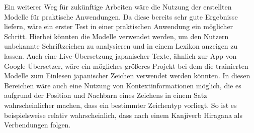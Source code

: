 \documentclass[twoside,a4paper]{IEEEtran}
\begin{document}
Ein weiterer Weg für zukünftige Arbeiten wäre die Nutzung der erstellten Modelle für praktische Anwendungen. Da diese bereits sehr gute Ergebnisse liefern, wäre ein erster Test in einer praktischen Anwendung ein möglicher Schritt. Hierbei könnten die Modelle verwendet werden, um den Nutzern unbekannte Schriftzeichen zu analysieren und in einem Lexikon anzeigen zu lassen. Auch eine Live-Übersetzung japanischer Texte, ähnlich zur App von Google Übersetzer, wäre ein mögliches größeres Projekt bei dem die trainierten Modelle zum Einlesen japanischer Zeichen verwendet werden könnten. In diesen Bereichen wäre auch eine Nutzung von Kontextinformationen möglich, die es aufgrund der Position und Nachbarn eines Zeichens in einem Satz wahrscheinlicher machen, dass ein bestimmter Zeichentyp vorliegt. So ist es beispielsweise relativ wahrscheinlich, dass nach einem Kanjiverb Hiragana als Verbendungen folgen.



%
%
\end{document}
